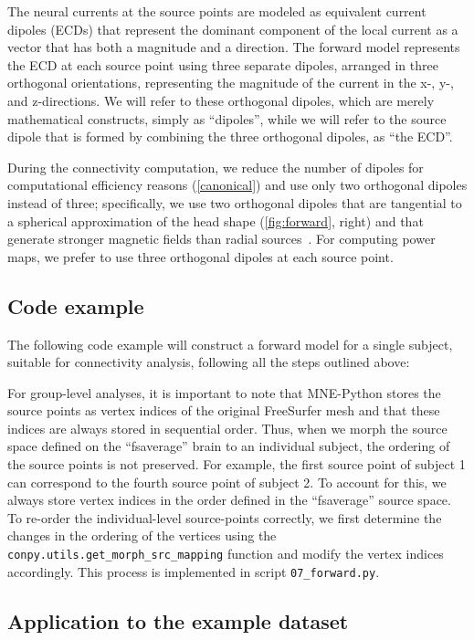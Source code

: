 \documentclass[utf8]{frontiersSCNS}
\renewcommand{\cite}[1]{~\citep{#1}}
\newcommand{\code}[1]{\lstinline{#1}}
\begin{document}
The neural currents at the source points are modeled as equivalent current dipoles (ECDs) that represent the dominant component of the local current as a vector that has both a magnitude and a direction.
The forward model represents the ECD at each source point using three separate dipoles, arranged in three orthogonal orientations, representing the magnitude of the current in the x-, y-, and z-directions.
We will refer to these orthogonal dipoles, which are merely mathematical constructs, simply as ``dipoles'', while we will refer to the source dipole that is formed by combining the three orthogonal dipoles, as ``the ECD''.

During the connectivity computation, we reduce the number of dipoles for computational efficiency reasons (\autoref{canonical}) and use only two orthogonal dipoles instead of three; specifically, we use two orthogonal dipoles that are tangential to a spherical approximation of the head shape (\autoref{fig:forward}, right) and that generate stronger magnetic fields than radial sources\cite{Hamalainen1993}.
For computing power maps, we prefer to use three orthogonal dipoles at each source point.

\subsection{Code example}\label{forward_example}
The following code example will construct a forward model for a single subject, suitable for connectivity analysis, following all the steps outlined above:


For group-level analyses, it is important to note that MNE-Python stores the source points as vertex indices of the original FreeSurfer mesh and that these indices are always stored in sequential order.
Thus, when we morph the source space defined on the ``fsaverage'' brain to an individual subject, the ordering of the source points is not preserved.
For example, the first source point of subject 1 can correspond to the fourth source point of subject 2.
To account for this, we always store vertex indices in the order defined in the ``fsaverage'' source space.
To re-order the individual-level source-points correctly, we first determine the changes in the ordering of the vertices using the \code{conpy.utils.get_morph_src_mapping} function and modify the vertex indices accordingly.
This process is implemented in script \code{07_forward.py}.

\subsection{Application to the example dataset}
\end{document}
